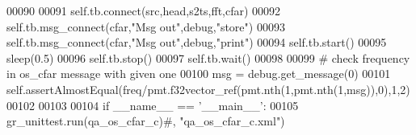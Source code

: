 \begin{DoxyCode}
00090         
00091         self.tb.connect(src,head,s2ts,fft,cfar)
00092         self.tb.msg\_connect(cfar,\textcolor{stringliteral}{"Msg out"},debug,\textcolor{stringliteral}{"store"})
00093         self.tb.msg\_connect(cfar,\textcolor{stringliteral}{"Msg out"},debug,\textcolor{stringliteral}{"print"})
00094         self.tb.start()
00095         sleep(0.5)
00096         self.tb.stop()
00097         self.tb.wait()
00098         
00099         \textcolor{comment}{# check frequency in os\_cfar message with given one}
00100         msg = debug.get\_message(0)
00101         self.assertAlmostEqual(freq/pmt.f32vector\_ref(pmt.nth(1,pmt.nth(1,msg)),0),1,2)
00102 
00103 
00104 \textcolor{keywordflow}{if} \_\_name\_\_ == \textcolor{stringliteral}{'\_\_main\_\_'}:
00105     gr\_unittest.run(qa\_os\_cfar\_c)\textcolor{comment}{#, "qa\_os\_cfar\_c.xml")}
\end{DoxyCode}
